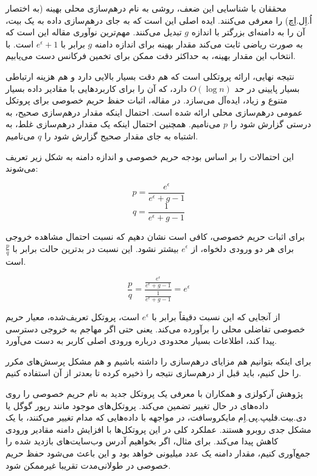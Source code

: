 محققان با شناسایی این ضعف، روشی به نام درهم‌سازی محلی بهینه (به اختصار اُ.اِل.اِچ) را معرفی می‌کنند. ایده اصلی این است که به جای درهم‌سازی داده به یک بیت، آن را به دامنه‌ای بزرگتر با اندازه $g$ تبدیل می‌کنند. مهم‌ترین نوآوری مقاله این است که به صورت ریاضی ثابت می‌کند مقدار بهینه برای اندازه دامنه $g$ برابر با $e^\epsilon + 1$ است. با انتخاب این مقدار بهینه، به حداکثر دقت ممکن برای تخمین فرکانس دست می‌یابیم.

نتیجه نهایی، ارائه پروتکلی است که هم دقت بسیار بالایی دارد و هم هزینه ارتباطی بسیار پایینی در حد $O(\log n)$ دارد، که آن را برای کاربردهایی با مقادیر داده بسیار متنوع و زیاد، ایده‌آل می‌سازد. در مقاله، اثبات حفظ حریم خصوصی برای پروتکل عمومی درهم‌سازی محلی ارائه شده است. احتمال اینکه مقدار درهم‌سازی صحیح، به درستی گزارش شود را $p$ می‌نامیم. همچنین احتمال اینکه یک مقدار درهم‌سازی غلط، به اشتباه به جای مقدار صحیح گزارش شود را $q$ می‌نامیم.

این احتمالات را بر اساس بودجه حریم خصوصی و اندازه دامنه به شکل زیر تعریف می‌شوند:

$$p = \frac{e^\epsilon}{e^\epsilon + g - 1}$$
$$q = \frac{1}{e^\epsilon + g - 1}$$


برای اثبات حریم خصوصی، کافی است نشان دهیم که نسبت احتمال مشاهده خروجی برای هر دو ورودی دلخواه، از $e^\epsilon$ بیشتر نشود. این نسبت در بدترین حالت برابر با $\frac{p}{q}$ است.

\begin{equation}
\frac{p}{q} = \frac{ \frac{e^\epsilon}{e^\epsilon + g - 1} }{ \frac{1}{e^\epsilon + g - 1} } = e^\epsilon
\label{equ:worstCaseLDP}
\end{equation}

از آنجایی که این نسبت دقیقاً برابر با $e^\epsilon$ است، پروتکل تعریف‌شده، معیار حریم خصوصی تفاضلی محلی را برآورده می‌کند. یعنی حتی اگر مهاجم به خروجی دسترسی پیدا کند، اطلاعات بسیار محدودی درباره ورودی اصلی کاربر به دست می‌آورد.



برای اینکه بتوانیم هم مزایای درهم‌سازی را داشته باشیم و هم مشکل پرسش‌های مکرر را حل کنیم، باید قبل از درهم‌سازی نتیجه را ذخیره کرده تا بعد‌تر از آن استفاده کنیم.


پژوهش آرکولزی و همکاران  با معرفی یک پروتکل جدید به نام  حریم خصوصی را روی داده‌های در حال تغییر تضمین می‌کند. پروتکل‌های موجود مانند رپور گوگل یا دی.بیت.فلیپ.پی.اِم مایکروسافت، در مواجهه با داده‌هایی که مدام تغییر می‌کنند، با یک مشکل جدی روبرو هستند. عملکرد کلی در این پروتکل‌ها با افزایش دامنه مقادیر ورودی کاهش پیدا می‌کند. برای مثال، اگر بخواهیم آدرس وب‌سایت‌های بازدید شده را جمع‌آوری کنیم، مقدار دامنه یک عدد میلیونی خواهد بود و این باعث می‌شود حفظ حریم خصوصی در طولانی‌مدت تقریبا غیرممکن شود.

